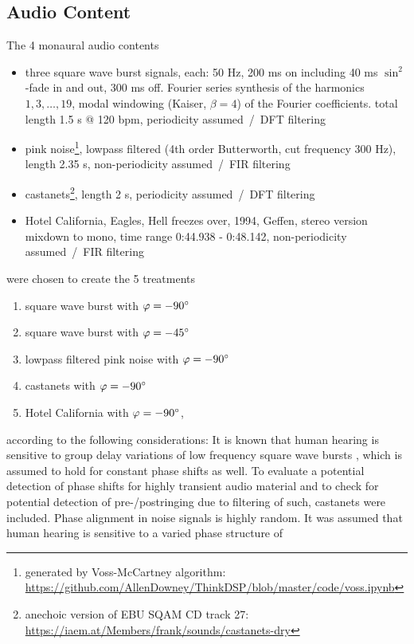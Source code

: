 \subsection{Audio Content}
The 4 monaural audio contents
\begin{itemize}
\item three square wave burst signals, each: 50 Hz, 200 ms on including
40 ms $\sin^2$-fade in and out,  300 ms off.
Fourier series synthesis of the
harmonics $1, 3,\dots, 19$, modal windowing (Kaiser, $\beta=4$) of the Fourier
coefficients. total length 1.5 s @ 120 bpm, periodicity assumed~/~DFT filtering
\item pink noise\footnote{generated by Voss-McCartney algorithm:\\\url{https://github.com/AllenDowney/ThinkDSP/blob/master/code/voss.ipynb}},
lowpass filtered
(4th order Butterworth, cut frequency 300 Hz),
length 2.35 s, non-periodicity assumed~/~FIR filtering
\item castanets\footnote{anechoic version of EBU SQAM CD track 27:\\\url{https://iaem.at/Members/frank/sounds/castanets-dry} },
length 2 s, periodicity assumed~/~DFT filtering
\item Hotel California, Eagles, Hell freezes over, 1994, Geffen,
stereo version mixdown to mono, time range 0:44.938 - 0:48.142, non-periodicity assumed~/~FIR filtering
\end{itemize}
were chosen to create the 5 treatments
\begin{enumerate}[I]
\item square wave burst with $\varphi=-90\degree$
\item square wave burst with $\varphi=-45\degree$
\item lowpass filtered pink noise with $\varphi=-90\degree$
\item castanets with $\varphi=-90\degree$
\item Hotel California with $\varphi=-90\degree$,
\end{enumerate}
%
according to the following considerations:
It is known that human hearing is sensitive to group delay variations of low
frequency square wave bursts \cite{Suzuki1980}, which is assumed to hold for
constant phase shifts as well.
%
To evaluate a potential detection of phase shifts for highly transient audio
material and to check for potential detection of pre-/postringing
due to filtering of such, castanets were included.
%
Phase alignment in noise signals is highly random.
It was assumed that human hearing is sensitive to a varied phase structure of
